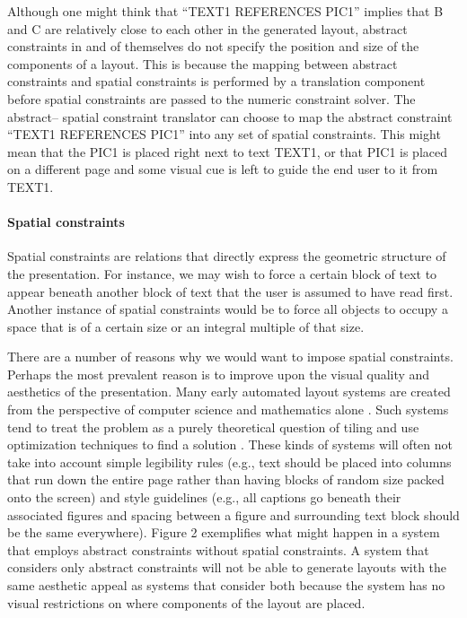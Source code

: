       Although one might think that “TEXT1 REFERENCES PIC1” implies that B and C
      are relatively close to each other in the generated layout, abstract
      constraints in and of themselves do not specify the position and size of
      the components of a layout. This is because the mapping between abstract
      constraints and spatial constraints is performed by a translation component
      before spatial constraints are passed to the numeric constraint solver. The
      abstract– spatial constraint translator can choose to map the abstract
      constraint “TEXT1 REFERENCES PIC1” into any set of spatial constraints.
      This might mean that the PIC1 is placed right next to text TEXT1, or that
      PIC1 is placed on a different page and some visual cue is left to guide the
      end user to it from TEXT1.

     \paragraph{Spatial constraints}
      \label{spatialcon}

      Spatial constraints are relations that directly express the geometric
      structure of the presentation. For instance, we may wish to force a certain
      block of text to appear beneath another block of text that the user is
      assumed to have read first. Another instance of spatial constraints would
      be to force all objects to occupy a space that is of a certain size or an
      integral multiple of that size.

      There are a number of reasons why we would want to impose spatial
      constraints. Perhaps the most prevalent reason is to improve upon the
      visual quality and aesthetics of the presentation. Many early automated
      layout systems are created from the perspective of computer science and
      mathematics alone \citep{beach-1}. Such systems tend to treat the problem
      as a purely theoretical question of tiling and use optimization techniques
      to find a solution \citep{luders-1}. These kinds of systems will often not
      take into account simple legibility rules (e.g., text should be placed into
      columns that run down the entire page rather than having blocks of random
      size packed onto the screen) and style guidelines (e.g., all captions go
      beneath their associated figures and spacing between a figure and
      surrounding text block should be the same everywhere). Figure 2 exemplifies
      what might happen in a system that employs abstract constraints without
      spatial constraints. A system that considers only abstract constraints will
      not be able to generate layouts with the same aesthetic appeal as systems
      that consider both because the system has no visual restrictions on where
      components of the layout are placed.

